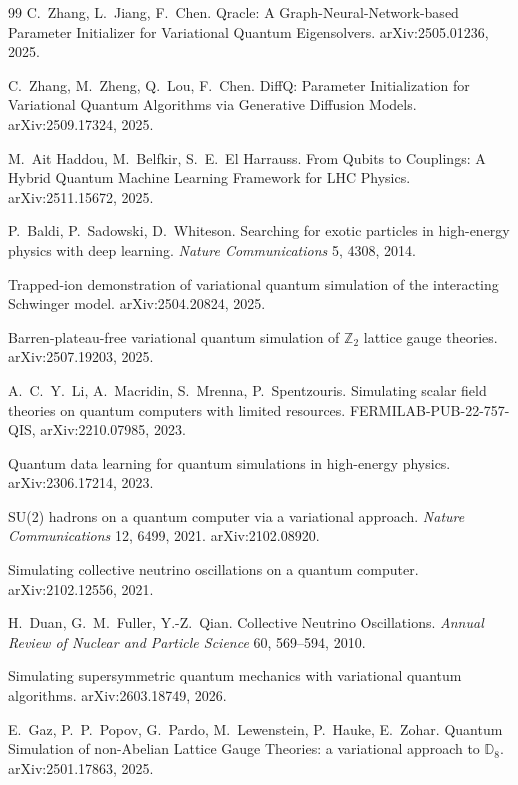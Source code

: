 \documentclass[11pt]{article}
\begin{document}
\begin{thebibliography}{99}
 C.~Zhang, L.~Jiang, F.~Chen. Qracle: A Graph-Neural-Network-based Parameter Initializer
for Variational Quantum Eigensolvers. arXiv:2505.01236, 2025.

 C.~Zhang, M.~Zheng, Q.~Lou, F.~Chen. DiffQ: Parameter Initialization for Variational
Quantum Algorithms via Generative Diffusion Models. arXiv:2509.17324, 2025.

 M.~Ait Haddou, M.~Belfkir, S.~E.~El Harrauss. From Qubits to Couplings: A
Hybrid Quantum Machine Learning Framework for LHC Physics. arXiv:2511.15672, 2025.

 P.~Baldi, P.~Sadowski, D.~Whiteson. Searching for exotic particles in high-energy
physics with deep learning. \emph{Nature Communications} 5, 4308, 2014.

 Trapped-ion demonstration of variational quantum simulation of the
interacting Schwinger model. arXiv:2504.20824, 2025.

 Barren-plateau-free variational quantum simulation of $\mathbb{Z}_2$ lattice gauge
theories. arXiv:2507.19203, 2025.

 A.~C.~Y.~Li, A.~Macridin, S.~Mrenna, P.~Spentzouris. Simulating scalar field
theories on quantum computers with limited resources. FERMILAB-PUB-22-757-QIS, arXiv:2210.07985, 2023.

 Quantum data learning for quantum simulations in high-energy physics.
arXiv:2306.17214, 2023.

 SU(2) hadrons on a quantum computer via a variational approach.
\emph{Nature Communications} 12, 6499, 2021. arXiv:2102.08920.

 Simulating collective neutrino oscillations on a quantum computer.
arXiv:2102.12556, 2021.

 H.~Duan, G.~M.~Fuller, Y.-Z.~Qian. Collective Neutrino Oscillations.
\emph{Annual Review of Nuclear and Particle Science} 60, 569--594, 2010.

 Simulating supersymmetric quantum mechanics with variational quantum algorithms.
arXiv:2603.18749, 2026.

 E.~Gaz, P.~P.~Popov, G.~Pardo, M.~Lewenstein, P.~Hauke, E.~Zohar. Quantum Simulation of
non-Abelian Lattice Gauge Theories: a variational approach to $\mathbb{D}_8$. arXiv:2501.17863, 2025.


\end{thebibliography}
\end{document}
